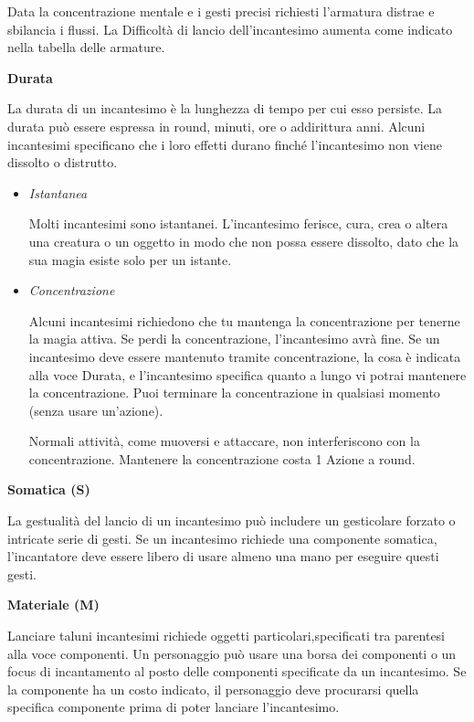 \begin{multicols}{2}
Data la concentrazione mentale e i gesti precisi richiesti l'armatura distrae e sbilancia i flussi. La Difficoltà di lancio dell'incantesimo aumenta come indicato nella tabella delle armature.\\

\medskip

\textbf{Durata}

La durata di un incantesimo è la lunghezza di tempo per cui esso persiste. La durata può essere espressa in round, minuti, ore o addirittura anni. Alcuni incantesimi specificano che i loro effetti durano finché l'incantesimo non viene dissolto o distrutto.

\begin{itemize}
	
\item
\textit{Istantanea}

Molti incantesimi sono istantanei. L'incantesimo ferisce, cura, crea o altera una creatura o un oggetto in modo che non possa essere dissolto, dato che la sua magia esiste solo per un istante.

\item

\textit{Concentrazione}

Alcuni incantesimi richiedono che tu mantenga la concentrazione per tenerne la magia attiva. Se perdi la concentrazione, l'incantesimo avrà fine. Se un incantesimo deve essere mantenuto tramite concentrazione, la cosa è indicata alla voce Durata, e l'incantesimo specifica quanto a lungo vi potrai mantenere la concentrazione. Puoi terminare la concentrazione in qualsiasi momento (senza usare un'azione).

Normali attività, come muoversi e attaccare, non interferiscono con la concentrazione. Mantenere la concentrazione costa 1 Azione a round.
\end{itemize}

\medskip

\textbf{Somatica (S)}

La gestualità del lancio di un incantesimo può includere un gesticolare forzato o intricate serie di gesti. Se un incantesimo richiede una componente somatica, l'incantatore deve essere libero di usare almeno una mano per eseguire questi gesti.

\medskip

\textbf{Materiale (M)}

Lanciare taluni incantesimi richiede oggetti particolari,specificati tra parentesi alla voce componenti. Un personaggio può usare una borsa dei componenti o un focus di incantamento al posto delle componenti specificate da un incantesimo. Se la componente ha un costo indicato, il personaggio deve procurarsi quella specifica componente prima di poter lanciare l'incantesimo.


\end{multicols}
